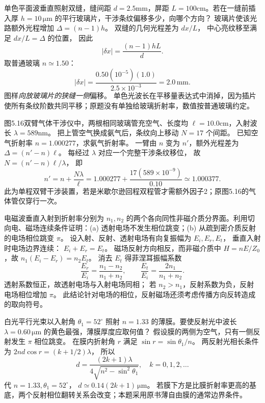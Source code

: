 单色平面波垂直照射双缝，缝间距 $d=2.5$mm，屏距 $L=100$cm。若在一缝前插入厚 $h=10\,\mathrm{\mu m}$ 的平行玻璃片，干涉条纹偏移多少，向哪个方向？
\exsolution
玻璃片使该光路额外光程增加
$\Delta=(n-1)h$。
双缝的几何光程差为 $dx/L$，
中心亮纹移至满足
$dx/L=\Delta$ 的位置，
因此
\[
\boxed{|\delta x|=\frac{(n-1)hL}{d}}.
\]
取普通玻璃 $n\simeq1.50$：
\[
\boxed{|\delta x|=\frac{0.50(10^{-5})(1.0)}
{2.5\times10^{-3}}=2.0\,\mathrm{mm}}.
\]
图样\emph{向放玻璃片的狭缝一侧}偏移。
\excheck 单色光波长在平移量表达式中消掉，因为插片使所有条纹阶数共同平移；原题没有单独给玻璃折射率，数值按普通玻璃约定。

图5.16双臂气体干涉仪中，两根相同玻璃管充空气、长度均
$\ell=10.0$cm，入射波长 $\lambda=589$nm。
把上管空气换成氨气后，条纹向上移动 $N=17$ 个间距。
已知空气折射率 $n=1.000277$，求氨气折射率。
\exsolution
一臂由 $n$ 变为 $n'$，额外光程差为
$\Delta=(n'-n)\ell$。
每经过 $\lambda$ 对应一个完整干涉条纹移位，
故
$N=(n'-n)\ell/\lambda$，
即
\[
\boxed{n'=n+\frac{N\lambda}{\ell}}
=1.000277+\frac{17(589\times10^{-9})}{0.10}
\simeq\boxed{1.000377}.
\]
\excheck 此为单程双臂干涉装置，若是米歇尔逊回程双程管才需额外因子2；原图5.16的气体管仅穿行一次。

电磁波垂直入射到折射率分别为 $n_1,n_2$ 的两个各向同性非磁介质分界面。利用切向电、磁场连续条件证明：(a) 透射电场不发生相位跳变；(b) 从疏到密介质反射的电场相位跳变 $\pi$。
\exsolution
设入射、反射、透射电场有向复振幅为
$E_i,E_r,E_t$，
垂直入射时电场边界连续：
$E_i+E_r=E_t$。
磁场反射方向相反，而非磁介质中
$H=nE/Z_0$，故
$n_1(E_i-E_r)=n_2E_t$。
消去 $E_t$ 得菲涅耳振幅系数
\[
\boxed{\frac{E_r}{E_i}=\frac{n_1-n_2}{n_1+n_2}},
\qquad
\boxed{\frac{E_t}{E_i}=\frac{2n_1}{n_1+n_2}}.
\]
透射系数恒正，故透射电场与入射电场同相；
若 $n_2>n_1$，反射系数为负，反射电场相位增加 $\pi$。
\excheck 此结论针对电场的相位，反射磁场还须考虑传播方向反转造成的取向符号。

白光平行光束以入射角 $\theta_1=52^\circ$ 照射
$n=1.33$ 的薄膜。要使反射光中波长 $\lambda=0.60\,\mathrm{\mu m}$ 的黄色最强，薄膜厚度应取何值？
\exsolution
假设膜的两侧为空气，只有一侧反射发生 $\pi$ 相位跳变。
在膜内折射角 $r$ 满足
$\sin r=\sin\theta_1/n$。
两反射光相长条件为
$2nd\cos r=(k+1/2)\lambda$，
所以
\[
\boxed{d=\frac{(2k+1)\lambda}
{4\sqrt{n^2-\sin^2\theta_1}}},\quad k=0,1,2,\ldots
\]
代 $n=1.33,\theta_1=52^\circ$，
$\boxed{d\simeq0.14(2k+1)\,\mathrm{\mu m}}$。
\excheck 若膜下方是比膜折射率更高的基底，两个反射相位翻转关系会改变；本题采用原书薄自由膜的通常边界条件。

